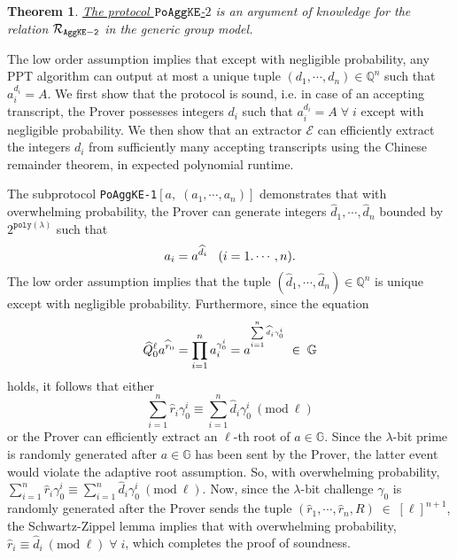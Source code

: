 \documentclass[11pt, lettersize, notitlepage, leqno, footskip=0.6cm]{article}
\newcommand{\bq}{\mathbb Q}
\newcommand{\pl}{\prod\limits}
\newcommand{\slim}{\sum\limits}
\newcommand{\ttt}{\texttt}
\newcommand{\bG}{\mathbb{G}}
\newcommand{\mc}{\mathcal}
\newcommand{\lam}{\lambda}
\newcommand{\what}{\widehat}
\newcommand{\vs}{\vspace{-0.15cm}}
\newcommand{\op}{overwhelming probability}
\newcommand{\np}{negligible probability}
\newcommand{\Mod}[1]{\ (\mathrm{mod}\ #1)}
\newcommand{\E}{\mc{E}}
\newtheorem{Thm}{Theorem}[section]
\numberwithin{equation}{section}
\begin{document}
\vspace{0.2cm}

\begin{Thm} \hyperlink{AggKE-2}{The protocol $\tt{PoAggKE}$-$2$} is an argument of knowledge for the relation $\mc{R}_{{\tt{AggKE-2}}}$ in the generic group model.\end{Thm}

\begin{prf} The low order assumption implies that except with \np, any PPT algorithm can output at most a unique tuple $(d_1,\cdots,d_n)\in\bq^n$ such that $a_i^{d_i} = A$. We first show that the protocol is sound, i.e. in case of an accepting transcript, the Prover possesses integers $d_i$ such that $a_i^{d_i} = A\;\forall\; i$ except with \np. We then show that an extractor $\E$ can efficiently extract the integers $d_i$ from sufficiently many accepting transcripts using the Chinese remainder theorem, in expected polynomial runtime.

The subprotocol \verb|PoAggKE-1|$[a,\;(a_1,\cdots,a_n)]$ demonstrates that with \op, the Prover can generate integers $\what{d}_1,\cdots,\what{d}_n$ bounded by $2^{\ttt{poly}(\lam)}$ such that \vs $$a_i = a^{\what{d}_i}\;\;\; (i=1.\cdots,n). \vs $$ The low order assumption implies that the tuple $(\what{d}_1,\cdots,\what{d}_n)\in\bq^n$ is unique except with \np. Furthermore, since the equation \vs $$\what{Q}_0^{\ell}a^{\what{r}_0} = \pl_{i=1}^{n} a_i^{\gamma_{0}^i}  = a^{^{\slim_{i=1}^n \what{d}_i\gamma_{0}^i}}\;\in\;\bG \vs $$ holds, it follows that either \vs $$\slim_{i=1}^n\what{r}_i\gamma_{0}^i\equiv \slim_{i=1}^n \what{d}_i\gamma_{0}^i\Mod{\ell}$$ or the Prover can efficiently extract an $\ell$-th root of $a\in\bG$. Since the $\lam$-bit prime is randomly generated after $a\in\bG$ has been sent by the Prover, the latter event would violate the adaptive root assumption. So, with \op, $\slim_{i=1}^n\what{r}_i\gamma_{0}^i\equiv \slim_{i=1}^n \what{d}_i\gamma_{0}^i\Mod{\ell}.$ Now, since the $\lam$-bit challenge $\gamma_{0}$ is randomly generated after the Prover sends the tuple $(\what{r}_1,\cdots,\what{r}_n, R)\;\in\;[\ell]^{n+1}$, the Schwartz-Zippel lemma implies that with \op, $\what{r}_i\equiv \what{d}_i\Mod{\ell}\;\forall\; i$, which completes the proof of soundness.


\end{prf}
\end{document}
